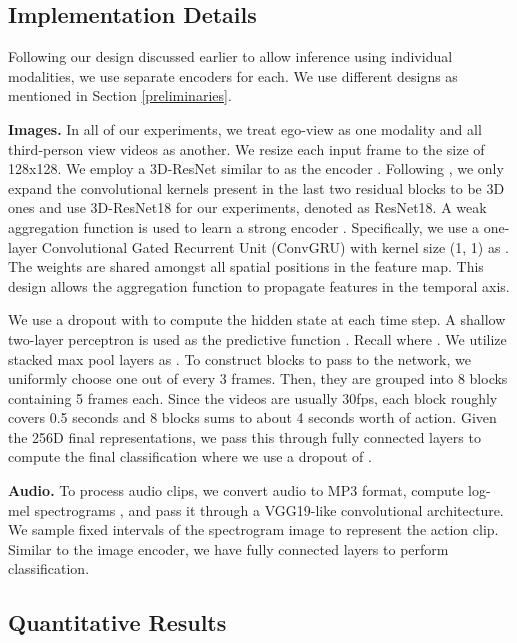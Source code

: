 \documentclass[final]{cvpr}
\begin{document}
\subsection{Implementation Details}
Following our design discussed earlier to allow inference using individual modalities, we use separate encoders for each. We use different designs as mentioned in Section \ref{preliminaries}.

\noindent\textbf{Images.} In all of our experiments, we treat ego-view as one modality and all third-person view videos as another. We resize each input frame to the size of 128x128. We employ a 3D-ResNet similar to \cite{hara2018can} as the encoder . Following \cite{dpc}, we only expand the convolutional kernels present in the last two residual blocks to be 3D ones and use 3D-ResNet18 for our experiments, denoted as ResNet18. A weak aggregation function  is used to learn a strong encoder . Specifically, we use a one-layer Convolutional Gated Recurrent Unit (ConvGRU) with kernel size (1, 1) as . The weights are shared amongst all spatial positions in the feature map. This design allows the aggregation function to propagate features in the temporal axis. 

We use a dropout \cite{dropout} with  to compute the hidden state at each time step. A shallow two-layer perceptron is used as the predictive function . Recall  where . We utilize stacked max pool layers as . To construct blocks to pass to the network, we uniformly choose one out of every 3 frames. Then, they are grouped into 8 blocks containing 5 frames each. Since the videos are usually 30fps, each block roughly covers 0.5 seconds and 8 blocks sums to about 4 seconds worth of action. Given the 256D final representations, we pass this through fully connected layers to compute the final classification where we use a dropout of .

\noindent\textbf{Audio.} To process audio clips, we convert audio to MP3 format, compute log-mel spectrograms \cite{logmel}, and pass it through a VGG19-like convolutional architecture. We sample fixed intervals of the spectrogram image to represent the action clip. Similar to the image encoder, we have fully connected layers to perform classification.

\vspace{-1pt}





\subsection{Quantitative Results}
\end{document}
